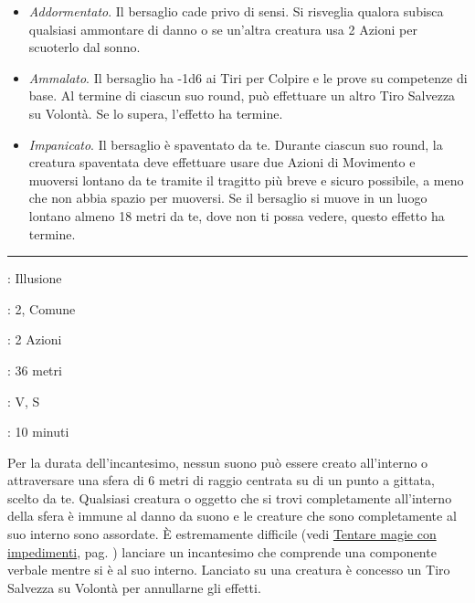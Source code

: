 \begin{multicols}{2}
\begin{itemize}[leftmargin=*] \setlength{\itemsep}{0pt}
	\item \emph{Addormentato}. Il bersaglio cade privo di sensi. Si risveglia qualora subisca qualsiasi ammontare di danno o se un'altra creatura usa 2 Azioni per scuoterlo dal sonno.
	\item \emph{Ammalato}. Il bersaglio ha -1d6 ai Tiri per Colpire e le prove su competenze di base. Al termine di ciascun suo round, può effettuare un altro Tiro Salvezza su Volontà. Se lo supera, l'effetto ha termine.
	\item \emph{Impanicato}. Il bersaglio è spaventato da te. Durante ciascun suo round, la creatura spaventata deve effettuare usare due Azioni di Movimento e muoversi lontano da te tramite il tragitto più breve e sicuro possibile, a meno che non abbia spazio per muoversi. Se il bersaglio si muove in un luogo lontano almeno 18 metri da te, dove non ti possa vedere, questo effetto ha termine.
\end{itemize}

\smallskip\noindent\rule{\linewidth}{2pt} \hypertarget{Silenzio}{}\smallskip{}
\noindent
\begin{description}[noitemsep, topsep=0pt, parsep=0pt, partopsep=0pt, leftmargin=0cm, labelwidth=2.8cm]
	\item[\textbf{Lista di Magia}]: Illusione
	\item[\textbf{Livello}]: 2, Comune
	\item[\textbf{T. di Lancio}]: 2 Azioni
	\item[\textbf{Gittata}]: 36 metri
	\item[\textbf{Componenti}]: V, S
	\item[\textbf{Durata}]: 10 minuti
\end{description}

Per la durata dell'incantesimo, nessun suono può essere creato all'interno o attraversare una sfera di 6 metri di raggio centrata su di un punto a gittata, scelto da te. Qualsiasi creatura o oggetto che si trovi completamente all'interno della sfera è immune al danno da suono e le creature che sono completamente al suo interno sono assordate. È estremamente difficile (vedi \hyperlink{magieconimpedimenti}{Tentare magie con impedimenti}, pag. \pageref{magieconimpedimenti} ) lanciare un incantesimo che comprende una componente verbale mentre si è al suo interno. Lanciato su una creatura è concesso un Tiro Salvezza su Volontà per annullarne gli effetti.


\end{multicols}
